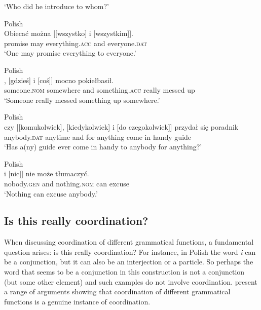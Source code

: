 \documentclass[output=paper]{../langscibook}
\begin{document}
\glt`Who did he introduce to whom?' \hfill \citep[121,\,(241)]{kall:93}
  \item\label{ex:lexsem:every:subj:objth}
    Polish\\\gll
      Obiecać można [[wszystko] i [wszystkim]]. \\
      promise may \phtm{[[}everything.\textsc{acc} and \phtm{[}everyone.\textsc{dat}\\
\glt`One may promise everything to everyone.'\nkjp
%
  \item\label{ex:lexsem:some:subj:adj:obj}
  Polish\\\gll
    [[Ktoś], [gdzieś] i [coś]] mocno pokiełbasił. \\
    \phtm{[[}someone.\textsc{nom} \phtm{[}somewhere and \phtm{[}something.\textsc{acc} really {messed up}\\
            \glt`Someone really messed something up somewhere.'\nkjp
%
  \item\label{ex:lexsem:any:objth:adj:obl}
    Polish\\\gll
      czy [[komukolwiek], [kiedykolwiek] i [do czegokolwiek]] {przydał się} poradnik \\
       \phtm{[[}anybody.\textsc{dat} \phtm{[}anytime and \phtm{[}for anything {come in handy} guide\\
\glt`Has a(ny) guide ever come in handy to anybody for anything?'\nkjp
  \item\label{ex:lexsem:nword:objemb:subjmain}
    Polish\\\gll
      [[nikogo] i [nic]] nie może tłumaczyć. \\
      \phtm{[[}nobody.\textsc{gen} and \phtm{[}nothing.\textsc{nom} \NEG{} can excuse\\
\glt`Nothing can excuse anybody.'\nkjp
\z

\subsection{Is this really coordination?}
\label{sec:Coordination:lexsem:real}

When discussing coordination of different grammatical functions, a
fundamental question arises: is this really coordination? For instance,
in Polish the word \emph{i} can be a conjunction, but it can also be an
interjection or a particle. So perhaps the word that seems to be a
conjunction in this construction is not a conjunction (but some other
element) and such examples do not involve coordination.
\citet{PatejukPrzepiorkowski2012,Patejuk2015,pat:prz:19:syntaxfest} present a range of arguments
showing that coordination of different grammatical functions is a
genuine instance of coordination.
\end{document}
